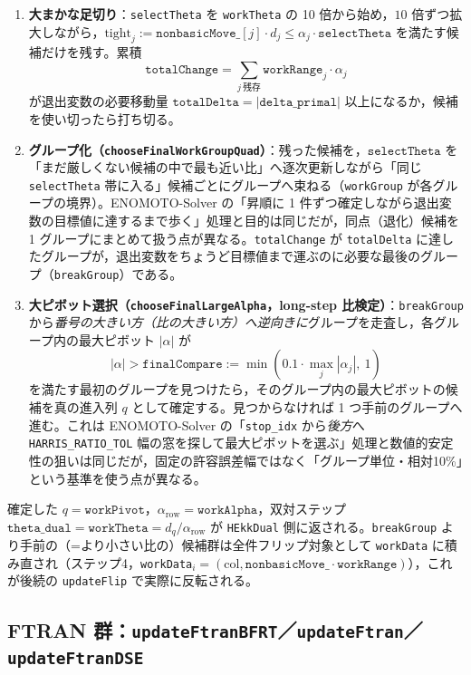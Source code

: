 \documentclass[11pt,a4paper]{ltjsarticle}
\newcommand{\code}[1]{\texttt{#1}}
\begin{document}
\begin{enumerate}
  \item \textbf{大まかな足切り}：\code{selectTheta} を \code{workTheta} の 10 倍から始め，$10$ 倍ずつ拡大しながら，$\text{tight}_j := \code{nonbasicMove\_}[j]\cdot d_j \le \alpha_j\cdot\code{selectTheta}$ を満たす候補だけを残す。累積
    \[
      \code{totalChange} = \sum_{j\ \text{残存}} \code{workRange}_j\cdot\alpha_j
    \]
    が退出変数の必要移動量 $\code{totalDelta}=|\code{delta\_primal}|$ 以上になるか，候補を使い切ったら打ち切る。
  \item \textbf{グループ化（\code{chooseFinalWorkGroupQuad}）}：残った候補を，$\code{selectTheta}$ を「まだ厳しくない候補の中で最も近い比」へ逐次更新しながら「同じ \code{selectTheta} 帯に入る」候補ごとにグループへ束ねる（\code{workGroup} が各グループの境界）。ENOMOTO-Solver の「昇順に 1 件ずつ確定しながら退出変数の目標値に達するまで歩く」処理と目的は同じだが，同点（退化）候補を 1 グループにまとめて扱う点が異なる。\code{totalChange} が \code{totalDelta} に達したグループが，退出変数をちょうど目標値まで運ぶのに必要な最後のグループ（\code{breakGroup}）である。
  \item \textbf{大ピボット選択（\code{chooseFinalLargeAlpha}，long-step 比検定）}：\code{breakGroup} から\emph{番号の大きい方（比の大きい方）へ逆向きに}グループを走査し，各グループ内の最大ピボット $|\alpha|$ が
    \[
      |\alpha| > \code{finalCompare} := \min(0.1\cdot\max_j|\alpha_j|,\ 1)
    \]
    を満たす最初のグループを見つけたら，そのグループ内の最大ピボットの候補を真の進入列 $q$ として確定する。見つからなければ 1 つ手前のグループへ進む。これは ENOMOTO-Solver の「\code{stop\_idx} から\emph{後方}へ \code{HARRIS\_RATIO\_TOL} 幅の窓を探して最大ピボットを選ぶ」処理と数値的安定性の狙いは同じだが，固定の許容誤差幅ではなく「グループ単位・相対10\%」という基準を使う点が異なる。
\end{enumerate}
確定した $q=\code{workPivot}$，$\alpha_{\mathrm{row}}=\code{workAlpha}$，双対ステップ $\code{theta\_dual}=\code{workTheta}=d_q/\alpha_{\mathrm{row}}$ が \code{HEkkDual} 側に返される。\code{breakGroup} より手前の（=より小さい比の）候補群は全件フリップ対象として \code{workData} に積み直され（ステップ4，\code{workData}$_i = (\text{col}, \code{nonbasicMove\_}\cdot\code{workRange})$），これが後続の \code{updateFlip} で実際に反転される。

\subsection{FTRAN 群：\code{updateFtranBFRT}／\code{updateFtran}／\code{updateFtranDSE}}
\end{document}
